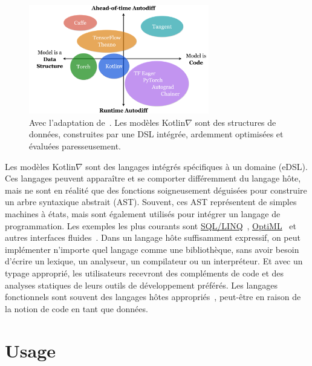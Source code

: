 \begin{figure}
\centering
\includegraphics[width=0.70\textwidth]{../figures/kotlingrad_diagram.png}
\caption{Avec l'adaptation de~\citet{van2018tangent}. Les modèles Kotlin$\nabla$ sont des structures de données, construites par une DSL intégrée, ardemment optimisées et évaluées paresseusement.}
\label{fig:kotlingrad_digram}
\end{figure}

Les modèles Kotlin$\nabla$ sont des langages intégrés spécifiques à un domaine (eDSL). Ces langages peuvent apparaître et se comporter différemment du langage hôte, mais ne sont en réalité que des fonctions soigneusement déguisées pour construire un arbre syntaxique abstrait (AST). Souvent, ces AST représentent de simples machines à états, mais sont également utilisés pour intégrer un langage de programmation. Les exemples les plus courants sont \href{https://docs.microsoft.com/en-us/dotnet/framework/data/adonet/sql/linq/}{SQL/LINQ}~\citep{meijer2006linq}, \href{http://stanford-ppl.github.io/Delite/optiml/}{OptiML}~\citep{sujeeth2011optiml} et autres interfaces fluides~\citep{fowler05fluent}. Dans un langage hôte suffisamment expressif, on peut implémenter n'importe quel langage comme une bibliothèque, sans avoir besoin d'écrire un lexique, un analyseur, un compilateur ou un interpréteur. Et avec un typage approprié, les utilisateurs recevront des compléments de code et des analyses statiques de leurs outils de développement préférés. Les langages fonctionnels sont souvent des langages hôtes appropriés~\citep{elliott2003compiling,rompf2010lightweight}, peut-être en raison de la notion de code en tant que données.

\section{Usage}

